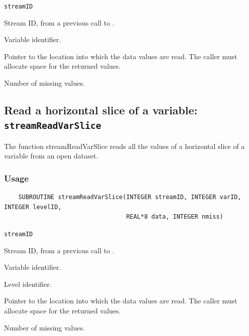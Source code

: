\hspace*{4mm}\begin{minipage}[]{15cm}
\begin{deflist}{\tt streamID\ }
\item[{\tt streamID}]
Stream ID, from a previous call to {}.
\item[{\tt varID}]
Variable identifier.
\item[{\tt data}]
Pointer to the location into which the data values are read.
                     The caller must allocate space for the returned values.
\item[{\tt nmiss}]
Number of missing values.

\end{deflist}
\end{minipage}


\subsection{Read a horizontal slice of a variable: {\tt streamReadVarSlice}}
\label{streamReadVarSlice}

The function streamReadVarSlice reads all the values of a horizontal slice of a variable
from an open dataset.
\subsubsection*{Usage}

\begin{verbatim}
    SUBROUTINE streamReadVarSlice(INTEGER streamID, INTEGER varID, INTEGER levelID, 
                                  REAL*8 data, INTEGER nmiss)
\end{verbatim}

\hspace*{4mm}\begin{minipage}[]{15cm}
\begin{deflist}{\tt streamID\ }
\item[{\tt streamID}]
Stream ID, from a previous call to {}.
\item[{\tt varID}]
Variable identifier.
\item[{\tt levelID}]
Level identifier.
\item[{\tt data}]
Pointer to the location into which the data values are read.
                     The caller must allocate space for the returned values.
\item[{\tt nmiss}]
Number of missing values.

\end{deflist}
\end{minipage}


